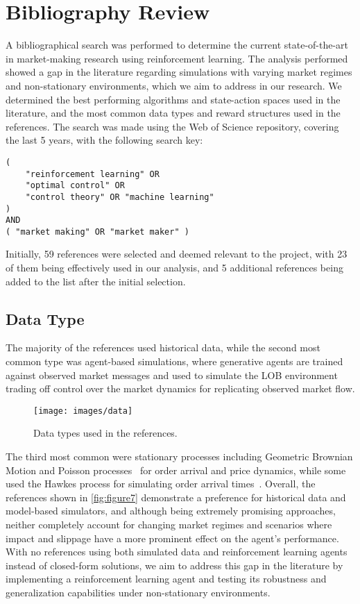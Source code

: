 \section{Bibliography Review}
\label{sec:bibliography-review}

A bibliographical search was performed to determine the current state-of-the-art in market-making research using reinforcement learning.
The analysis performed showed a gap in the literature regarding simulations with varying market regimes and non-stationary environments,
which we aim to address in our research.
We determined the best performing algorithms and state-action spaces used in the literature,
and the most common data types and reward structures used in the references.
The search was made using the Web of Science repository, covering the last 5 years, with the following search key:
\small
\begin{verbatim}
(
    "reinforcement learning" OR
    "optimal control" OR
    "control theory" OR "machine learning"
)
AND
( "market making" OR "market maker" )
\end{verbatim}

Initially, 59 references were selected and deemed relevant to the project,
with 23 of them being effectively used in our analysis, and 5 additional references being added to the list after the initial selection.

\subsection{Data Type}
\label{subsec:data-type}
The majority of the references used historical data, while the second most common type was agent-based simulations,
where generative agents are trained against observed market messages and used to simulate the LOB environment~\cite{Frey2023, Ganesh2019}
trading off control over the market dynamics for replicating observed market flow.

\begin{figure}
    \centering
    \texttt{[image: images/data]}
    \caption{Data types used in the references.}
    \label{fig:figure7}
\end{figure}

The third most common were stationary processes including Geometric Brownian Motion and Poisson processes~\cite{Gasperov2021, Sun2022} for
order arrival and price dynamics, while some used the Hawkes process for simulating order arrival times~\cite{Jerome2022, Selser2021}.
Overall, the references shown in \autoref{fig:figure7} demonstrate a preference for historical data and model-based simulators,
and although being extremely promising approaches, neither completely account for changing market regimes and scenarios where impact and
slippage have a more prominent effect on the agent's performance.
With no references using both simulated data and reinforcement learning agents instead of closed-form solutions,
we aim to address this gap in the literature by implementing a reinforcement learning agent and testing its robustness and generalization capabilities under non-stationary environments.

